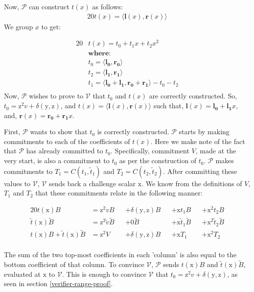\documentclass{article}
\newcommand{\eq}[1]{\begin{alignat*}{20}#1\end{alignat*}}
\renewcommand{\vec}[1]{\boldsymbol{#1}}
\newcommand{\ran}[1]{\mathrm{#1}}
\newcommand{\V}{\mathcal{V}}
\renewcommand{\P}{\mathcal{P}}
\newcommand{\dotp}[2]{\langle #1, #2 \rangle}
\newcommand{\blind}[1]{\widetilde{#1}}
\newcommand{\bt}{\blind{t}}
\newcommand{\bv}{\blind{v}}
\newcommand{\bB}{\blind{B}}
\begin{document}
Now, $\P$ can construct $t(x)$ as follows:
\eq{
	t(x) = \dotp{\vec{l}(x)}{\vec{r}(x)}
}
We group $x$ to get:

\eq{
	&t(x) = t_0 + t_1x + t_2x^2 \\
	&\textbf{where:} \\
	&t_0 = \dotp{\vec{l_0}}{\vec{r_0}}\\
	&t_2 = \dotp{\vec{l_1}}{\vec{r_1}}\\
	&t_1 = \dotp{\vec{l_0}+\vec{l_1}}{\vec{r_0} + \vec{r_1}} - t_0 - t_2 \\
}
Now, $\P$ wishes to prove to $\V$ that $t_0$ and $t(x)$ are correctly
constructed. So, $t_0 = \ran{z^2}v + \delta(\ran{y},\ran{z})$, and $t(x)
= \dotp{\vec{l}(x)}{\vec{r}(x)}$ such that, $\vec{l}(x) = \vec{l_0}
+ \vec{l_1}x$, and, $\vec{r}(x) = \vec{r_0} + \vec{r_1}x$.

First, $\P$ wants to show that $t_0$ is correctly constructed. $\P$
starts by making commitments to each of the coefficients of
$t(x)$. Here we make note of the fact that $\P$ has already committed
to $t_0$. Specifically, commitment $V$, made at the very start, is also
a commitment to $t_0$ as per the construction of $t_0$. $\P$ makes
commitments to $T_1 = C(t_1, \bt_1)$ and $T_2 = C(t_2, \bt_2)$. After
committing these values to $\V$, $\V$ sends back a challenge scalar
$\ran{x}$. We know from the definitions of $V$, $T_1$ and $T_2$ that these
commitments relate in the following manner:

\eq{
	t(\ran{x})B                   &= \ran{z^2}vB      &&+ \delta(\ran{y},\ran{z})B &&+ \ran{x}t_1B       &&+ \ran{x^2}t_2B \\
	\bt(\ran{x})\bB               &= \ran{z^2}\bv \bB &&+ 0\bB                     &&+ \ran{x} \bt_1 \bB &&+ \ran{x^2} \bt_2 \bB\\
	t(\ran{x})B + \bt(\ran{x})\bB &= \ran{z^2}V       &&+ \delta(\ran{y},\ran{z})B &&+ \ran{x}T_1        &&+ \ran{x^2}T_2 \\
}

The sum of the two top-most coefficients in each 'column' is also
equal to the bottom coefficient of that column. To convince $\V$, $\P$
sends $t(\ran{x})B$ and $\bt(\ran{x})\bB$, evaluated at $\ran{x}$
to $\V$. This is enough to convince $\V$ that $t_0 = \ran{z^2}v +
\delta(\ran{y},\ran{z})$, as seen in section \ref{verifier-range-proof}.
\end{document}
